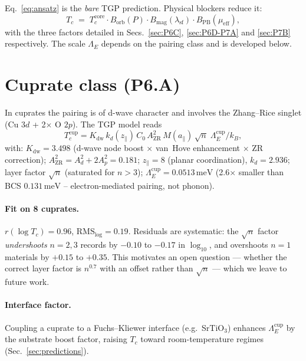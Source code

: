 \documentclass[11pt,a4paper]{article}
\newcommand{\lamsf}{\lambda_{\mathrm{sf}}}
\newcommand{\meV}{\,\mathrm{meV}}
\newcommand{\LamE}{\Lambda_{E}}
\begin{document}
Eq.~\eqref{eq:ansatz} is the \emph{bare} TGP prediction. Physical
blockers reduce it:
\begin{equation}\label{eq:full-Tc}
  T_{c} \;=\; T_{c}^{\mathrm{core}}
  \cdot B_{\mathrm{orb}}(P)
  \cdot B_{\mathrm{mag}}(\lamsf)
  \cdot B_{\mathrm{PB}}(\mu_{\mathrm{eff}}),
\end{equation}
with the three factors detailed in Secs.~\ref{sec:P6C},
\ref{sec:P6D-P7A} and \ref{sec:P7B} respectively. The scale $\LamE$
depends on the pairing class and is developed below.

\section{Cuprate class (P6.A)}\label{sec:P6A}

In cuprates the pairing is of d-wave character and involves the
Zhang--Rice singlet (Cu $3d$ + 2$\times$ O $2p$). The TGP model reads
\begin{equation}\label{eq:cuprate}
  T_{c}^{\mathrm{cup}}
  = K_{\mathrm{dw}}\,k_{d}(z_{\parallel})\,C_{0}\,A_{\mathrm{ZR}}^{2}\,
    M(a_{\parallel})\,\sqrt{n}\;\LamE^{\mathrm{cup}}/k_{B},
\end{equation}
with:
$K_{\mathrm{dw}}=3.498$ (d-wave node boost $\times$ van~Hove enhancement
$\times$ ZR correction);
$A_{\mathrm{ZR}}^{2}=A_{d}^{2}+2A_{p}^{2}=0.181$;
$z_{\parallel}=8$ (planar coordination), $k_{d}=2.936$;
layer factor $\sqrt{n}$ (saturated for $n>3$);
$\LamE^{\mathrm{cup}}=0.0513\meV$ (2.6$\times$ smaller than BCS
$0.131\meV$ -- electron-mediated pairing, not phonon).

\paragraph{Fit on 8 cuprates.}
$r(\log T_{c})=0.96$, $\mathrm{RMS}_{\log}=0.19$. Residuals are
systematic: the $\sqrt{n}$ factor \emph{undershoots} $n=2,3$ records by
$-0.10$ to $-0.17$ in $\log_{10}$, and overshoots $n=1$ materials by
$+0.15$ to $+0.35$. This motivates an open question --- whether the
correct layer factor is $n^{0.7}$ with an offset rather than $\sqrt{n}$ ---
which we leave to future work.

\paragraph{Interface factor.} Coupling a cuprate to a Fuchs--Kliewer
interface (e.g.\ SrTiO$_{3}$) enhances $\LamE^{\mathrm{cup}}$ by the
substrate boost factor, raising $T_{c}$ toward room-temperature regimes
(Sec.~\ref{sec:predictions}).
\end{document}
